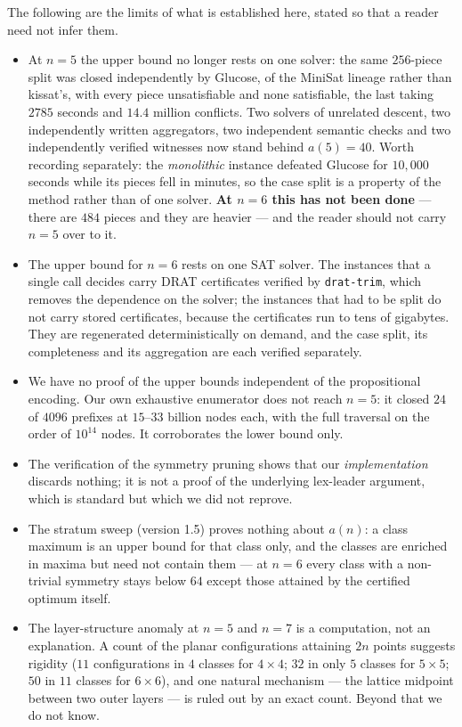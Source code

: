 \documentclass[11pt,a4paper]{article}
\begin{document}
The following are the limits of what is established here, stated so that a reader need not infer them.
\begin{itemize}\itemsep2pt
\item At $n=5$ the upper bound no longer rests on one solver: the same $256$-piece split was closed
independently by Glucose, of the MiniSat lineage rather than kissat's, with every piece unsatisfiable and none
satisfiable, the last taking $2785$ seconds and $14.4$ million conflicts.  Two solvers of unrelated descent, two
independently written aggregators, two independent semantic checks and two independently verified witnesses now
stand behind $a(5)=40$.  Worth recording separately: the \emph{monolithic} instance defeated Glucose for
$10{,}000$ seconds while its pieces fell in minutes, so the case split is a property of the method rather than
of one solver.  \textbf{At $n=6$ this has not been done} --- there are $484$ pieces and they are heavier --- and
the reader should not carry $n=5$ over to it.
\item The upper bound for $n=6$ rests on one SAT solver.  The instances that a single call decides carry
DRAT certificates verified by \texttt{drat-trim}, which removes the dependence on the solver; the instances
that had to be split do not carry stored certificates, because the certificates run to tens of gigabytes.
They are regenerated deterministically on demand, and the case split, its completeness and its aggregation are
each verified separately.
\item We have no proof of the upper bounds independent of the propositional encoding.  Our own exhaustive
enumerator does not reach $n=5$: it closed $24$ of $4096$ prefixes at $15$--$33$ billion nodes each, with the
full traversal on the order of $10^{14}$ nodes.  It corroborates the lower bound only.
\item The verification of the symmetry pruning shows that our \emph{implementation} discards nothing; it is
not a proof of the underlying lex-leader argument, which is standard but which we did not reprove.
\item The stratum sweep (version 1.5) proves nothing about $a(n)$: a class maximum is an upper bound for that
class only, and the classes are enriched in maxima but need not contain them --- at $n=6$ every class with a
non-trivial symmetry stays below $64$ except those attained by the certified optimum itself.
\item The layer-structure anomaly at $n=5$ and $n=7$ is a computation, not an explanation.  A count of the
planar configurations attaining $2n$ points suggests rigidity ($11$ configurations in $4$ classes for
$4\times4$; $32$ in only $5$ classes for $5\times5$; $50$ in $11$ classes for $6\times6$), and one natural
mechanism --- the lattice midpoint between two outer layers --- is ruled out by an exact count.  Beyond that we
do not know.
\end{itemize}
\end{document}
